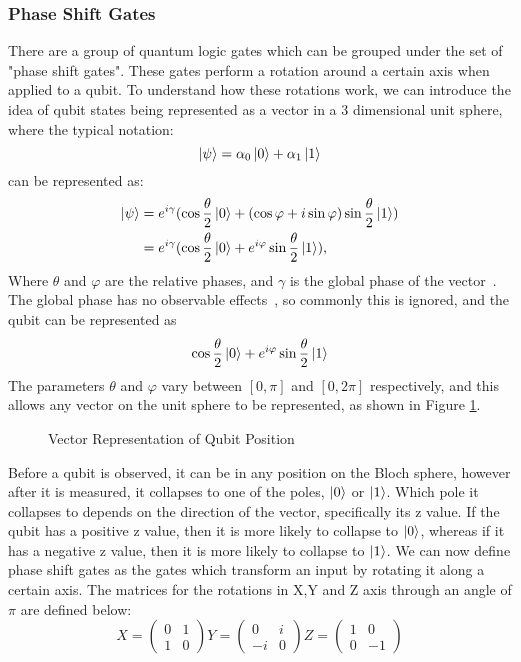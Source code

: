 \subsubsection{Phase Shift Gates}
There are a group of quantum logic gates which can be grouped under the set of "phase shift gates". These gates perform a rotation around a certain axis when applied to a qubit. To understand how these rotations work, we can introduce the idea of qubit states being represented as a vector in a 3 dimensional unit sphere, where the typical notation: $$\ket{\psi} = \alpha_0\ket{0} + \alpha_1\ket{1}$$ can be represented as: 
\begin{align*} \ket{\psi} &= e^{i\gamma}(\cos{\frac{\theta}{2}}\ket{0} + (\cos{\varphi} + i\sin{\varphi})\sin{\frac{\theta}{2}}\ket{1}) \\
&= e^{i\gamma}(\cos{\frac{\theta}{2}}\ket{0} + e^{i\varphi}\sin{\frac{\theta}{2}}\ket{1}),
\end{align*}
Where $\theta$ and $\varphi$ are the relative phases, and $\gamma$ is the global phase of the vector~\cite{nielsen2002quantum}. The global phase has no observable effects~\cite{nielsen2002quantum}, so commonly this is ignored, and the qubit can be represented as 
$$\cos{\frac{\theta}{2}}\ket{0} + e^{i\varphi}\sin{\frac{\theta}{2}}\ket{1}$$ 
The parameters $\theta$ and $\varphi$ vary between $[0,\pi]$ and $[0,2\pi]$ respectively, and this allows any vector on the unit sphere to be represented, as shown in Figure \ref{fig:3Dvector}.
\begin{figure}[!htb]
\centering
\resizebox{7cm}{!}{}
\caption{Vector Representation of Qubit Position}
\label{fig:3Dvector}
\end{figure}
Before a qubit is observed, it can be in any position on the Bloch sphere, however after it is measured, it collapses to one of the poles, $\ket{0}$ or $\ket{1}$. Which pole it collapses to depends on the direction of the vector, specifically its z value. If the qubit has a positive z value, then it is more likely to collapse to $\ket{0}$, whereas if it has a negative z value, then it is more likely to collapse to $\ket{1}$. We can now define phase shift gates as the gates which transform an input by rotating it along a certain axis. The matrices for the rotations in X,Y and Z axis through an angle of $\pi$ are defined below:
$$X = \begin{pmatrix} 0 & 1 \\ 1 & 0 \end{pmatrix} Y = \begin{pmatrix} 0 & i \\ -i & 0 \end{pmatrix} Z = \begin{pmatrix} 1 & 0 \\ 0 & -1 \end{pmatrix}$$
